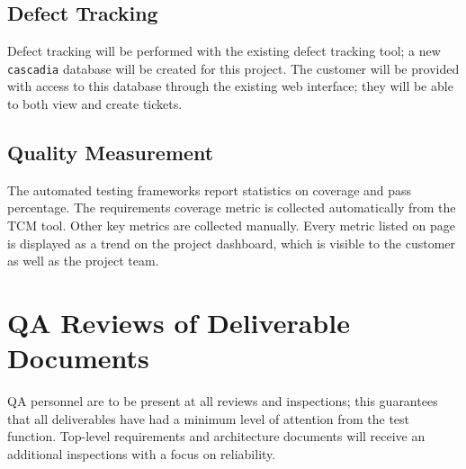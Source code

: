 \documentclass[11pt]{wacomepd}
\begin{document}
\section{Defect Tracking}
Defect tracking will be performed with the existing defect tracking tool; a new {\tt cascadia}
database will be created for this project.  The customer will be provided with access to this
database through the existing web interface; they will be able to both view and create tickets.


\section{Quality Measurement}
The automated testing frameworks report statistics on coverage and pass percentage.  The
requirements coverage metric is collected automatically from the TCM tool.  Other key metrics are
collected manually.  Every metric listed on page \pageref{metrics} is displayed as a trend on the
project dashboard, which is visible to the customer as well as the project team.


\chapter{QA Reviews of Deliverable Documents}

QA personnel are to be present at all reviews and inspections; this guarantees that all deliverables
have had a minimum level of attention from the test function.  Top-level requirements and
architecture documents will receive an additional inspections with a focus on reliability.



\end{document}
